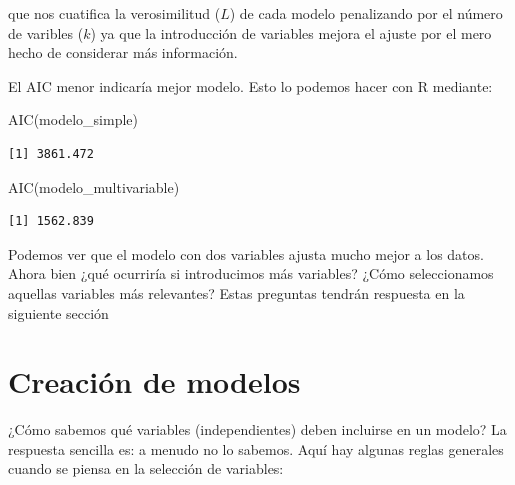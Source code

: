 \documentclass[
]{book}
\newenvironment{Shaded}{\begin{snugshade}}{\end{snugshade}}
\newcommand{\FunctionTok}[1]{\textcolor[rgb]{0.00,0.00,0.00}{#1}}
\newcommand{\NormalTok}[1]{#1}
\begin{document}
que nos cuatifica la verosimilitud (\(L\)) de cada modelo penalizando por el número de varibles (\(k\)) ya que la introducción de variables mejora el ajuste por el mero hecho de considerar más información.

El AIC menor indicaría mejor modelo. Esto lo podemos hacer con R mediante:

\begin{Shaded}
\begin{Highlighting}[]
\FunctionTok{AIC}\NormalTok{(modelo\_simple)}
\end{Highlighting}
\end{Shaded}

\begin{verbatim}
[1] 3861.472
\end{verbatim}

\begin{Shaded}
\begin{Highlighting}[]
\FunctionTok{AIC}\NormalTok{(modelo\_multivariable)}
\end{Highlighting}
\end{Shaded}

\begin{verbatim}
[1] 1562.839
\end{verbatim}

Podemos ver que el modelo con dos variables ajusta mucho mejor a los datos. Ahora bien ¿qué ocurriría si introducimos más variables? ¿Cómo seleccionamos aquellas variables más relevantes? Estas preguntas tendrán respuesta en la siguiente sección

\hypertarget{creaciuxf3n-de-modelos}{%
\section{Creación de modelos}\label{creaciuxf3n-de-modelos}}

¿Cómo sabemos qué variables (independientes) deben incluirse en un modelo? La respuesta sencilla es: a menudo no lo sabemos. Aquí hay algunas reglas generales cuando se piensa en la selección de variables:
\end{document}
